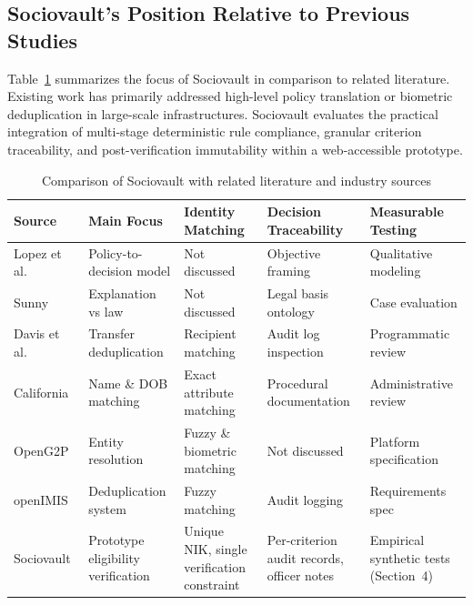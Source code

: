 \documentclass[runningheads]{llncs}
\begin{document}
\subsection{Sociovault's Position Relative to Previous Studies}
\label{subsec:gap}

Table~\ref{tab:comparison} summarizes the focus of Sociovault in comparison to related literature. Existing work has primarily addressed high-level policy translation or biometric deduplication in large-scale infrastructures. Sociovault evaluates the practical integration of multi-stage deterministic rule compliance, granular criterion traceability, and post-verification immutability within a web-accessible prototype.

\begin{table}[htbp]
\caption{Comparison of Sociovault with related literature and industry sources}
\label{tab:comparison}
\centering
\small
\renewcommand{\arraystretch}{1.15}
\begin{tabular}{p{2.0cm}p{2.4cm}p{2.4cm}p{2.4cm}p{2.3cm}}
\hline
\textbf{Source} & \textbf{Main Focus} & \textbf{Identity Matching} & \textbf{Decision Traceability} & \textbf{Measurable Testing} \\
\hline
Lopez et al.~\cite{lopez2022envisioning} & Policy-to-decision model & Not discussed & Objective framing & Qualitative modeling \\
Sunny~\cite{sunny2025neuro} & Explanation vs law & Not discussed & Legal basis ontology & Case evaluation \\
Davis et al.~\cite{davis2016evidence} & Transfer deduplication & Recipient matching & Audit log inspection & Programmatic review \\
California~\cite{california1987match,california1994letter} & Name \& DOB matching & Exact attribute matching & Procedural documentation & Administrative review \\
OpenG2P~\cite{openg2p_dedup} & Entity resolution & Fuzzy \& biometric matching & Not discussed & Platform specification \\
openIMIS~\cite{openimis2022algorithm} & Deduplication system & Fuzzy matching & Audit logging & Requirements spec \\
Sociovault & Prototype eligibility verification & Unique NIK, single verification constraint & Per-criterion audit records, officer notes & Empirical synthetic tests (Section~4) \\
\hline
\end{tabular}
\end{table}
\end{document}
